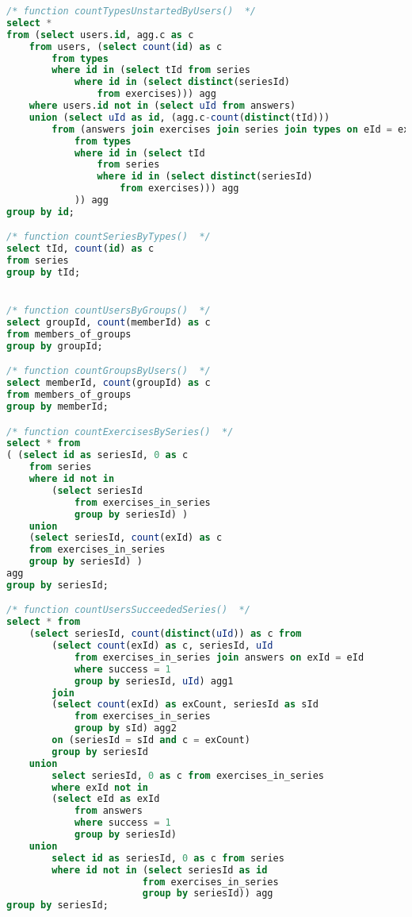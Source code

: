 \begin{lstlisting}[language=sql]
/* function countTypesUnstartedByUsers()  */
select *
from (select users.id, agg.c as c
    from users, (select count(id) as c
        from types
        where id in (select tId from series
            where id in (select distinct(seriesId)
                from exercises))) agg
    where users.id not in (select uId from answers)
    union (select uId as id, (agg.c-count(distinct(tId)))
        from (answers join exercises join series join types on eId = exercises.id and seriesId = series.id and tId = types.id), (select count(id) as c
            from types
            where id in (select tId
                from series
                where id in (select distinct(seriesId)
                    from exercises))) agg
            )) agg
group by id;

/* function countSeriesByTypes()  */
select tId, count(id) as c
from series
group by tId;


/* function countUsersByGroups()  */
select groupId, count(memberId) as c
from members_of_groups
group by groupId;

/* function countGroupsByUsers()  */
select memberId, count(groupId) as c
from members_of_groups
group by memberId;

/* function countExercisesBySeries()  */
select * from
( (select id as seriesId, 0 as c
    from series
    where id not in
        (select seriesId
            from exercises_in_series
            group by seriesId) )
    union
    (select seriesId, count(exId) as c
    from exercises_in_series
    group by seriesId) )
agg
group by seriesId;

/* function countUsersSucceededSeries()  */
select * from
    (select seriesId, count(distinct(uId)) as c from
        (select count(exId) as c, seriesId, uId
            from exercises_in_series join answers on exId = eId
            where success = 1
            group by seriesId, uId) agg1
        join
        (select count(exId) as exCount, seriesId as sId
            from exercises_in_series
            group by sId) agg2
        on (seriesId = sId and c = exCount)
        group by seriesId
    union
        select seriesId, 0 as c from exercises_in_series
        where exId not in
        (select eId as exId
            from answers
            where success = 1
            group by seriesId)
    union
        select id as seriesId, 0 as c from series
        where id not in (select seriesId as id
                        from exercises_in_series
                        group by seriesId)) agg
group by seriesId;


\end{lstlisting}
